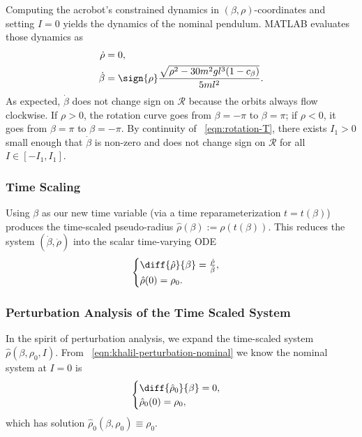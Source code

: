 Computing the acrobot's constrained dynamics in \((\beta,\rho)\)-coordinates and
setting \(I = 0\) yields the dynamics of the nominal pendulum.
MATLAB evaluates those dynamics as
\begin{align}\label{eqn:acrobot-rot-mu-dot-nom}
    \dot{\rho} &= 0
    , \\
    \label{eqn:acrobot-rot-alpha-dot-nom}
    \dot{\beta} &=  \sign{\rho} 
    \frac{\sqrt{\rho^2 - 30m^2gl^3(1 - c_\beta)}}{5ml^2}
    .
\end{align}
As expected, \(\dot{\beta}\) does not change sign on \(\mathcal{R}\) because the
orbits always flow clockwise.
If \(\rho > 0\), the rotation curve goes from \(\beta = -\pi\) to 
\(\beta = \pi\); 
if \(\rho < 0\), it goes from \(\beta = \pi\) to \(\beta = -\pi\).
By continuity of ~\eqref{eqn:rotation-T}, there exists \(I_1 > 0\) small enough
that \(\dot{\beta}\) is non-zero and does not change sign on \(\mathcal{R}\) for
all \(I \in [-I_1,I_1]\).

\subsubsection*{Time Scaling}

Using \(\beta\) as our new time variable (via a time reparameterization
\(t = t(\beta)\)) produces the time-scaled pseudo-radius
\(\hat{\rho}(\beta) := \rho(t(\beta))\).
This reduces the system \((\dot{\beta},\dot{\rho})\) into the scalar time-varying
ODE
\begin{equation}\label{eqn:rhohat-dot}
    \begin{cases}
        \diff{\hat{\rho}}{\beta} = \frac{\dot{\rho}}{\dot{\beta}}
        , \\
        \hat{\rho}(0) = \rho_0
        .
    \end{cases}
\end{equation}

\subsubsection*{Perturbation Analysis of the Time Scaled System}

In the spirit of perturbation analysis, we expand the time-scaled system 
\(\hat{\rho}(\beta,\rho_0,I)\). 
From ~\eqref{eqn:khalil-perturbation-nominal} we know the nominal system at
\(I = 0\) is
\[
    \begin{cases} 
        \diff{\hat{\rho}_0}{\beta} = 0
        , \\
        \hat{\rho}_0(0) = \rho_0
        ,
    \end{cases}
\]
which has solution \(\hat{\rho}_0(\beta,\rho_0) \equiv \rho_0\).

